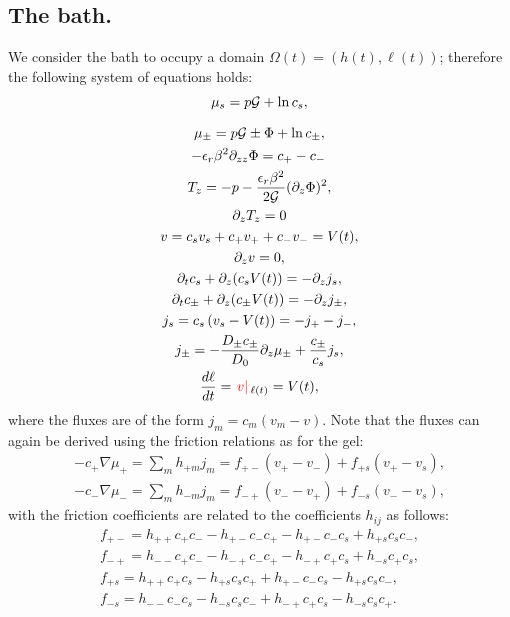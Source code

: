 \documentclass[12pt]{extarticle}
\begin{document}
\subsection{The bath.}
We consider the bath to occupy a domain $\Omega(t)=(h(t),\ell(t))$; therefore the following system of equations holds:
\begin{gather}
\begin{aligned}
\mu_s = p \mathcal{G} + \ln c_s, 
\end{aligned}\\[2.5mm]
\mu_\pm = p \mathcal{G} \pm \Phi + \ln c_\pm ,\\
-\epsilon_r\beta^2\partial_{zz} \Phi = c_+-c_-\, \\
T_z= -p-\frac{\epsilon_r\beta^2 }{2\mathcal{G}} (\partial_z \Phi)^2,\\
\partial_z T_z=0\\
v=c_sv_s +c_+v_++c_-v_-=V(t),\\
\partial_z v = 0,\\
\partial_t c_s + \partial_z (c_sV(t))=-\partial_z j_s,\\
\partial_t c_\pm +\partial_z(c_\pm V(t))= -\partial_z j_\pm,\label{fluxes1.2}\\
j_s =c_s\left(v_s-V(t)\right)=-j_+-j_-,\\
j_\pm= - \frac{D_\pm c_\pm}{D_0}\partial_z \mu_\pm+\frac{c_\pm}{c_s}j_s,\\
\frac{d\ell}{dt}=\left.\color{red}v\right|_{\ell(t)}=V(t),
\end{gather}
where the fluxes are of the form $j_m=c_m (v_m-v)$. Note that the fluxes can again be derived using the friction relations as for the gel:
\begin{eqnarray}
-c_+\nabla \mu_+ = \sum_{m} h_{+m} j_{m} = f_{+-} \left(v_+ - v_-\right) + f_{+s} \left(v_+-v_s\right),\\
-c_-\nabla \mu_- = \sum_{m} h_{-m} j_{m} = f_{-+} \left(v_- - v_+\right) + f_{-s} \left(v_--v_s\right),
\end{eqnarray}
with the friction coefficients are related to the coefficients $h_{ij}$ as follows:
\begin{eqnarray}
f_{+-}= h_{++}c_+c_- - h_{+-}c_-c_+-h_{+-}c_-c_s+h_{+s}c_sc_-,\\
f_{-+}= h_{--}c_+c_- - h_{-+}c_-c_+-h_{-+}c_+c_s+h_{-s}c_+c_s,\\
f_{+s} = h_{++}c_+c_s - h_{+s}c_sc_++h_{+-}c_-c_s-h_{+s}c_sc_-,\\
f_{-s} = h_{--}c_-c_s - h_{-s}c_sc_-+h_{-+}c_+c_s-h_{-s}c_sc_+.
\end{eqnarray}
\end{document}
